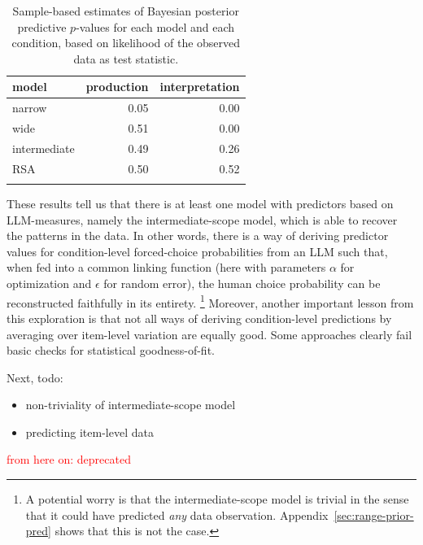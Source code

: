 \documentclass{article}
\begin{document}
\begin{table}[ht]
\centering

\begin{tabular}{lrr}
  \toprule
  model        & production & interpretation \\ \midrule
  narrow       & 0.05       & 0.00 \\
  wide         & 0.51       & 0.00 \\
  intermediate & 0.49       & 0.26 \\
  RSA          & 0.50       & 0.52 \\
  \bottomrule \\
\end{tabular}

\caption{Sample-based estimates of Bayesian posterior predictive $p$-values for each model and each condition, based on likelihood of the observed data as test statistic.}
\label{tab:Bppp-values}
\end{table}

These results tell us that there is at least one model with predictors based on LLM-measures, namely the intermediate-scope model, which is able to recover the patterns in the data.
In other words, there is a way of deriving predictor values for condition-level forced-choice probabilities from an LLM such that, when fed into a common linking function (here with parameters $\alpha$ for optimization and $\epsilon$ for random error), the human choice probability can be reconstructed faithfully in its entirety. \footnote{
  A potential worry is that the intermediate-scope model is trivial in the sense that it could have predicted \emph{any} data observation.
  Appendix~\ref{sec:range-prior-pred} shows that this is not the case.
}
Moreover, another important lesson from this exploration is that not all ways of deriving condition-level predictions by averaging over item-level variation are equally good.
Some approaches clearly fail basic checks for statistical goodness-of-fit.



\bigskip

Next, todo:

\begin{itemize}
  \item non-triviality of intermediate-scope model
  \item predicting item-level data
\end{itemize}


\newpage

\textcolor{red}{from here on: deprecated}
\end{document}

